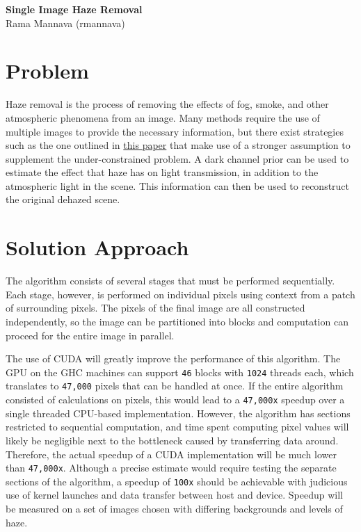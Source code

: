 \documentclass{article}
\begin{document}
\thispagestyle{plain}
\begin{center}
    {\huge \textbf{Single Image Haze Removal}} \\
    \bigskip
    {\large Rama Mannava (rmannava)}
\end{center}

\bigskip

\section*{Problem}
Haze removal is the process of removing the effects of fog, smoke, and other atmospheric phenomena from an image. Many methods require the use of multiple images to provide the necessary information, but there exist strategies such as the one outlined in \href{http://kaiminghe.com/publications/cvpr09.pdf}{this paper} that make use of a stronger assumption to supplement the under-constrained problem. A dark channel prior can be used to estimate the effect that haze has on light transmission, in addition to the atmospheric light in the scene. This information can then be used to reconstruct the original dehazed scene.

\section*{Solution Approach}
The algorithm consists of several stages that must be performed sequentially. Each stage, however, is performed on individual pixels using context from a patch of surrounding pixels. The pixels of the final image are all constructed independently, so the image can be partitioned into blocks and computation can proceed for the entire image in parallel.

The use of CUDA will greatly improve the performance of this algorithm. The GPU on the GHC machines can support \texttt{46} blocks with \texttt{1024} threads each, which translates to \texttt{47,000} pixels that can be handled at once. If the entire algorithm consisted of calculations on pixels, this would lead to a \texttt{47,000x} speedup over a single threaded CPU-based implementation. However, the algorithm has sections restricted to sequential computation, and time spent computing pixel values will likely be negligible next to the bottleneck caused by transferring data around. Therefore, the actual speedup of a CUDA implementation will be much lower than \texttt{47,000x}. Although a precise estimate would require testing the separate sections of the algorithm, a speedup of \texttt{100x} should be achievable with judicious use of kernel launches and data transfer between host and device. Speedup will be measured on a set of images chosen with differing backgrounds and levels of haze.
\end{document}
